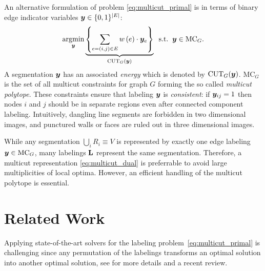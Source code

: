 An alternative formulation of problem \eqref{eq:multicut_primal}
is in terms of binary edge indicator variables
$\boldsymbol y \in \{0,1\}^{| E |}$:
\begin{align}
\argmin_{\y}
\underbrace{%
    \left\{
        \sum_{e=(i,j) \in E} \w \left(e\right) \cdot \y_{e}
    \right\}%
}_{%
    \CUT_G(\y)%
}%
\;\;\text{s.t.}\;\;\y \in \MC_G.
\label{eq:multicut_dual}
\end{align}
%
A segmentation $\boldsymbol y$ has an associated \emph{energy}
which is denoted by $\text{CUT}_G(\boldsymbol y)$.
%
$\text{MC}_G$ is the set of all multicut
constraints \cite{chopra_1993_mp} for graph $G$ forming
the so called \emph{multicut polytope}.
These constraints ensure that labeling $\boldsymbol y$ is
\emph{consistent}:
if $\boldsymbol y_{ij}=1$ then nodes $i$ and $j$ should be in
separate regions even after connected component labeling. Intuitively,
dangling line segments are forbidden in two dimensional images,
and punctured walls or faces are ruled out in three dimensional images.

While any segmentation $\bigcup_{i} R_i \equiv V$ is represented by exactly one
edge labeling $\boldsymbol y\in\text{MC}_G$, many labelings $\mathbf{L}$ represent the same segmentation.
Therefore, a multicut representation \eqref{eq:multicut_dual} is preferrable
to avoid large multiplicities of local optima.
%
However, an efficient handling of the multicut polytope is
essential.






\section{Related Work\label{sec:gcg_related_work}}
Applying state-of-the-art solvers for the labeling
problem~\eqref{eq:multicut_primal} is challenging since any permutation of
the labelings transforms an optimal solution into another optimal solution,
see \cite{kappes_2013_arxiv} for more details and a recent review.


